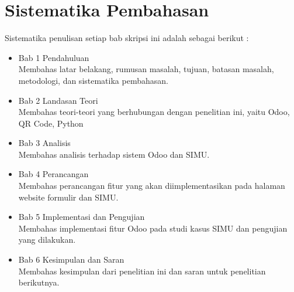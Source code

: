 \section{Sistematika Pembahasan}
\label{sec:sispem}
Sistematika penulisan setiap bab skripsi ini adalah sebagai berikut :
\begin{itemize}
	\item Bab 1 Pendahuluan \\
	Membahas latar belakang, rumusan masalah, tujuan, batasan masalah, metodologi, dan sistematika pembahasan.
	\item Bab 2 Landasan Teori \\
	Membahas teori-teori yang berhubungan dengan penelitian ini, yaitu Odoo, QR Code, Python
	\item Bab 3 Analisis \\
	Membahas analisis terhadap sistem Odoo dan SIMU.
	\item Bab 4 Perancangan \\
	Membahas perancangan fitur yang akan diimplementasikan pada halaman website formulir dan SIMU.
	\item Bab 5 Implementasi dan Pengujian \\
	Membahas implementasi fitur Odoo pada studi kasus SIMU dan pengujian yang dilakukan.
	\item Bab 6 Kesimpulan dan Saran \\
	Membahas kesimpulan dari penelitian ini dan saran untuk penelitian berikutnya.
\end{itemize}
